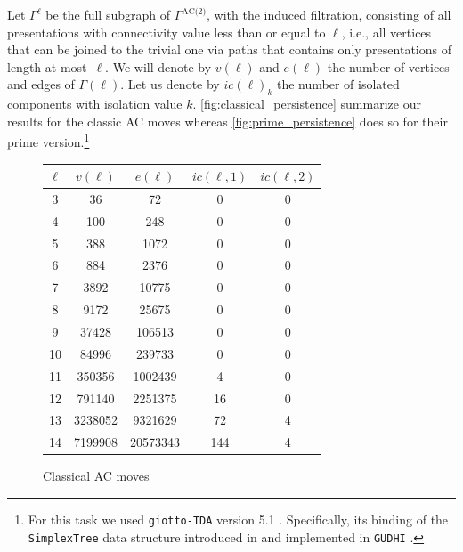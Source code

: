 Let $\Gamma^\ell$ be the full subgraph of $\Gamma^{\text{AC(2)}}$, with the induced filtration, consisting of all presentations with connectivity value less than or equal to $\ell$, i.e., all vertices that can be joined to the trivial one via paths that contains only presentations of length at most~$\ell$.
We will denote by $v(\ell)$ and $e(\ell)$ the number of vertices and edges of $\Gamma(\ell)$.
Let us denote by $ic(\ell)_k$ the number of isolated components with isolation value $k$.
\autoref{fig:classical_persistence} summarize our results for the classic AC moves whereas \autoref{fig:prime_persistence} does so for their prime version.\footnote{For this task we used \texttt{giotto-TDA} version 5.1 \cite{tauzin2021giotto}.
	Specifically, its binding of the \texttt{SimplexTree} data structure introduced in \cite{boissonnat2014simplex} and implemented in \texttt{GUDHI} \cite{maria2014gudhi}.}

\begin{figure}
	\begin{tabular}{|c|c|c|c|c|}
		\hline
		$\ell$ & $v(\ell)$ & $e(\ell)$ & $ic(\ell,1)$ & $ic(\ell,2)$ \\ \hline
		3 & 36 & 72 & 0 & 0 \\ \hline
		4 & 100 & 248 & 0 & 0 \\ \hline
		5 & 388 & 1072 & 0 & 0 \\ \hline
		6 & 884 & 2376 & 0 & 0 \\ \hline
		7 & 3892 & 10775 & 0 & 0 \\ \hline
		8 & 9172 & 25675 & 0 & 0 \\ \hline
		9 & 37428 & 106513 & 0 & 0 \\ \hline
		10 & 84996 & 239733 & 0 & 0 \\ \hline
		11 & 350356 & 1002439 & 4 & 0 \\ \hline
		12 & 791140 & 2251375 & 16 & 0 \\ \hline
		13 & 3238052 & 9321629 & 72 & 4 \\ \hline
		14 & 7199908 & 20573343 & 144 & 4 \\ \hline
	\end{tabular}
	\caption{Classical AC moves}
	\label{fig:classical_persistence}
\end{figure}

